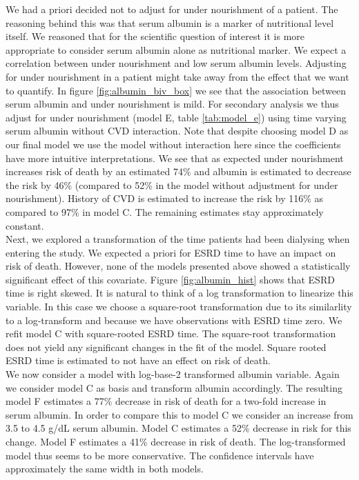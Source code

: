 \documentclass[paper=a4, fontsize=11pt]{scrartcl} %
\numberwithin{equation}{section} %
\numberwithin{figure}{section} %
\numberwithin{table}{section} %
\begin{document}
We had a priori decided not to adjust for under nourishment of a patient. The reasoning behind this was that serum albumin is a marker of nutritional level itself. We reasoned that for the scientific question of interest it is more appropriate to consider serum albumin alone as nutritional marker. We expect a correlation between under nourishment and low serum albumin levels. Adjusting for under nourishment in a patient might take away from the effect that we want to quantify. In figure \ref{fig:albumin_biv_box} we see that the association between serum albumin and under nourishment is mild. For secondary analysis we thus adjust for under nourishment (model E, table \ref{tab:model_e}) using time varying serum albumin without CVD interaction. Note that despite choosing model D as our final model we use the model without interaction here since the coefficients have more intuitive interpretations. We see that as expected under nourishment increases risk of death by an estimated 74\% and albumin is estimated to decrease the risk by 46\% (compared to 52\% in the model without adjustment for under nourishment). History of CVD is estimated to increase the risk by 116\% as compared to 97\% in model C. The remaining estimates stay approximately constant.\\

Next, we explored a transformation of the time patients had been dialysing when entering the study. We expected a priori for ESRD time to have an impact on risk of death. However, none of the models presented above showed a statistically significant effect of this covariate. Figure \ref{fig:albumin_hist} shows that ESRD time is right skewed. It is natural to think of a log transformation to linearize this variable. In this case we choose a square-root transformation due to its similarlity to a log-transform and because we have observations with ESRD time zero. We refit model C with square-rooted ESRD time. The square-root transformation does not yield any significant changes in the fit of the model. Square rooted ESRD time is estimated to not have an effect on risk of death.\\

We now consider a model with log-base-2 transformed albumin variable. Again we consider model C as basis and transform albumin accordingly. The resulting model F estimates a 77\% decrease in risk of death for a two-fold increase in serum albumin. In order to compare this to model C we consider an increase from 3.5 to 4.5 g/dL serum albumin. Model C estimates a 52\% decrease in risk for this change. Model F estimates a 41\% decrease in risk of death. The log-transformed model thus seems to be more conservative. The confidence intervals have approximately the same width in both models.
\end{document}
